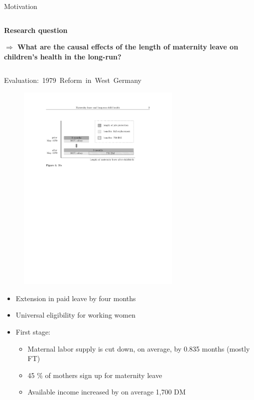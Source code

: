 \documentclass[usenames,dvipsnames]{beamer} %
\begin{document}
\begin{frame}{Motivation}
\begin{columns}
\begin{column}{.57\textwidth}
\begin{itemize}
\bigskip
\textbf{{Research question}}
\begin{tcolorbox}[colframe=beamer@ifoblue!75!black, boxrule=0.3mm]
\textbf{$\Rightarrow$ What are the causal effects of the length of maternity leave on children's health in the long-run?}
\end{tcolorbox}
\end{itemize}	
\end{column}

		
\end{columns}
\end{frame}

\begin{frame}{\mbox{Evaluation: 1979 Reform in West Germany}}

\begin{figure}
\centering
\includegraphics[width = 0.7\textwidth]{../../analysis/graphs/SOEP/Reform_shortened.pdf}
\end{figure}


\begin{itemize}
		\item Extension in paid leave by four months
		\item Universal eligibility for working women
		\item First stage: 
		\begin{itemize} 
			\item Maternal labor supply is cut down, on average, by 0.835 months (mostly FT)
			\item 45 \% of mothers sign up for maternity leave
			\item Available income increased by on average 1,700 DM
		\end{itemize}
\end{itemize}


\end{frame}
\end{document}
